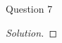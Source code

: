\begin{solution}{Question 7}\label{ques:7}
    \begin{question}
    \end{question}
    \tcblower{}
    \begin{proof}[Solution]
    \end{proof}
\end{solution}
